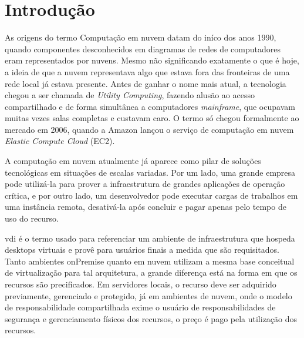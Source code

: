 
\chapter{Introdução}
\label{cap:introducao}

As origens do termo Computação em nuvem datam do iníco dos anos 1990, quando componentes desconhecidos em diagramas de redes de computadores eram representados por nuvens. Mesmo não significando exatamente o que é hoje, a ideia de que a nuvem representava algo que estava fora das fronteiras de uma rede local já estava presente. Antes de ganhar o nome mais atual, a tecnologia chegou a ser chamada de \textit{Utility Computing}, fazendo alusão ao acesso compartilhado e de forma simultânea a computadores \textit{mainframe}, que ocupavam muitas vezes salas completas e custavam caro. O termo só chegou formalmente ao mercado em 2006, quando a Amazon lançou o serviço de computação em nuvem \textit{Elastic Compute Cloud} (EC2). \citep{cloudcomputingcambridge}

A computação em nuvem atualmente já aparece como pilar de soluções tecnológicas em situações de
escalas variadas. Por um lado, uma grande empresa pode utilizá-la para prover a infraestrutura de
grandes aplicações de operação crítica, e por outro lado, um desenvolvedor pode executar cargas de
trabalhos em uma instância remota, desativá-la após concluir e pagar apenas pelo tempo de uso do
recurso. \citep{taurioncloud}

\gls{vdi} é o termo usado para referenciar um ambiente de infraestrutura que hospeda \glspl{desktop} virtuais e provê para usuários finais a medida que são requisitados. Tanto ambientes \gls{onPremise} quanto em nuvem utilizam a mesma base conceitual de virtualização para tal arquitetura, a grande diferença está na forma em que os recursos são precificados. Em servidores locais, o recurso deve ser adquirido previamente, gerenciado e protegido, já em ambientes de nuvem, onde o modelo de responsabilidade compartilhada exime o usuário de responsabilidades de segurança e gerenciamento físicos dos recursos, o preço é pago pela utilização dos recursos. \citep{cloudcomputingcambridge}

